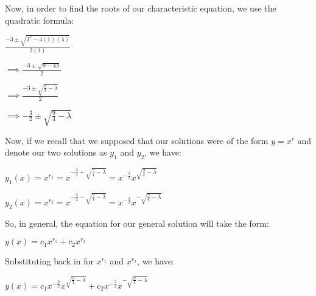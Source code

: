 \documentclass[executivepaper]{article}
\begin{document}
\begin{flushleft}
\begin{center}
\end{center}

Now, in order to find the roots of our characteristic equation, we use the quadratic formula:

\begin{center}

$\frac{-3 \pm \sqrt{3^2-4(1)(\lambda)}}{2(1)}$

\hspace{1mm}

$\implies \frac{-3 \pm \sqrt{9-4 \lambda}}{2}$

\hspace{1mm}

$\implies \frac{-3 \pm \sqrt{\frac{9}{4}-\lambda}}{2}$

\hspace{1mm}

$\implies -\frac{3}{2} \pm \sqrt{\frac{9}{4}-\lambda}$

\end{center}

Now, if we recall that we supposed that our solutions were of the form $y=x^r$ and denote our two solutions as $y_{1}$ and $y_{2}$, we have: 

\begin{center}

$y_{1}(x)=x^{r_{1}}=x^{-\frac{3}{2}+\sqrt{\frac{9}{4}-\lambda}}=x^{-\frac{3}{2}}x^{\sqrt{\frac{9}{4}-\lambda}}$

\hspace{1mm}

$y_{2}(x)=x^{r_{2}}=x^{-\frac{3}{2}-\sqrt{\frac{9}{4}-\lambda}}=x^{-\frac{3}{2}}x^{-\sqrt{\frac{9}{4}-\lambda}}$

\end{center}

So, in general, the equation for our general solution will take the form:

\begin{center}

$y(x)=c_{1}x^{r_{1}}+c_{2}x^{r_{2}}$

\end{center}

Substituting back in for $x^{r_{1}}$ and $x^{r_{2}}$, we have:

\pagebreak

\vspace*{-40mm}

\begin{center}

$y(x)=c_{1}x^{-\frac{3}{2}}x^{\sqrt{\frac{9}{4}-\lambda}}+c_{2}x^{-\frac{3}{2}}x^{-\sqrt{\frac{9}{4}-\lambda}}$


\end{center}
\end{flushleft}
\end{document}
